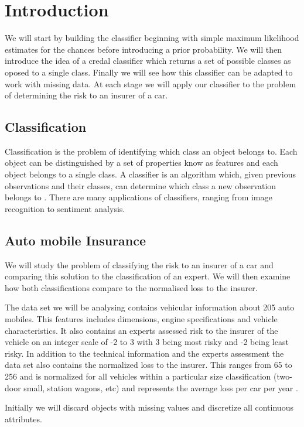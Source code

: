 \chapter{Introduction}

We will start by building the classifier beginning with simple maximum likelihood estimates for the chances before introducing a prior probability. We will then introduce the idea of a credal classifier which returns a set of possible classes as oposed to a single class. Finally we will see how this classifier can be adapted to work with missing data. At each stage we will apply our classifier to the problem of determining the risk to an insurer of a car.

\section{Classification}

Classification is the problem of identifying which class an object belongs to. Each object can be distinguished by a set of properties know as features and each object belongs to a single class. A classifier is an algorithm which, given previous observations and their classes, can determine which class a new observation belongs to \cite{Theodoridis03}. There are many applications of classifiers, ranging from image recognition to sentiment analysis.

\section{Auto mobile Insurance}

We will study the problem of classifying the risk to an insurer of a car and comparing this solution to the classification of an expert. We will then examine how both classifications compare to the normalised loss to the insurer.

The data set we will be analysing contains vehicular information about 205 auto mobiles. This features includes dimensions, engine specifications and vehicle characteristics. It also contains an experts assessed risk to the insurer of the vehicle on an integer scale of -2 to 3 with 3 being most risky and -2 being least risky. In addition to the technical information and the experts assessment the data set also contains the normalized loss to the insurer. This ranges from 65 to 256 and is normalized for all vehicles within a particular size classification (two-door small, station wagons, etc) and represents the average loss per car per year \cite{Automobile}.

Initially we will discard objects with missing values and discretize all continuous attributes.



	
